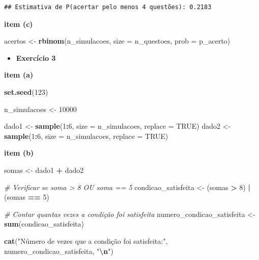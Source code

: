 \documentclass[
]{book}
\newenvironment{Shaded}{\begin{snugshade}}{\end{snugshade}}
\newcommand{\AttributeTok}[1]{\textcolor[rgb]{0.13,0.29,0.53}{#1}}
\newcommand{\CommentTok}[1]{\textcolor[rgb]{0.56,0.35,0.01}{\textit{#1}}}
\newcommand{\ConstantTok}[1]{\textcolor[rgb]{0.56,0.35,0.01}{#1}}
\newcommand{\DecValTok}[1]{\textcolor[rgb]{0.00,0.00,0.81}{#1}}
\newcommand{\FunctionTok}[1]{\textcolor[rgb]{0.13,0.29,0.53}{\textbf{#1}}}
\newcommand{\NormalTok}[1]{#1}
\newcommand{\OtherTok}[1]{\textcolor[rgb]{0.56,0.35,0.01}{#1}}
\newcommand{\SpecialCharTok}[1]{\textcolor[rgb]{0.81,0.36,0.00}{\textbf{#1}}}
\newcommand{\StringTok}[1]{\textcolor[rgb]{0.31,0.60,0.02}{#1}}
\providecommand{\tightlist}{%
  \setlength{\itemsep}{0pt}\setlength{\parskip}{0pt}}
\begin{document}
\begin{verbatim}
## Estimativa de P(acertar pelo menos 4 questões): 0.2183
\end{verbatim}

\textbf{item (c)}

\begin{Shaded}
\begin{Highlighting}[]
\NormalTok{acertos }\OtherTok{\textless{}{-}} \FunctionTok{rbinom}\NormalTok{(n\_simulacoes, }\AttributeTok{size =}\NormalTok{ n\_questoes, }\AttributeTok{prob =}\NormalTok{ p\_acerto)}
\end{Highlighting}
\end{Shaded}

\begin{itemize}
\tightlist
\item
  \textbf{Exercício 3}
\end{itemize}

\textbf{item (a)}

\begin{Shaded}
\begin{Highlighting}[]
\FunctionTok{set.seed}\NormalTok{(}\DecValTok{123}\NormalTok{)}

\NormalTok{n\_simulacoes }\OtherTok{\textless{}{-}} \DecValTok{10000}

\NormalTok{dado1 }\OtherTok{\textless{}{-}} \FunctionTok{sample}\NormalTok{(}\DecValTok{1}\SpecialCharTok{:}\DecValTok{6}\NormalTok{, }\AttributeTok{size =}\NormalTok{ n\_simulacoes, }\AttributeTok{replace =} \ConstantTok{TRUE}\NormalTok{)}
\NormalTok{dado2 }\OtherTok{\textless{}{-}} \FunctionTok{sample}\NormalTok{(}\DecValTok{1}\SpecialCharTok{:}\DecValTok{6}\NormalTok{, }\AttributeTok{size =}\NormalTok{ n\_simulacoes, }\AttributeTok{replace =} \ConstantTok{TRUE}\NormalTok{)}
\end{Highlighting}
\end{Shaded}

\textbf{item (b)}

\begin{Shaded}
\begin{Highlighting}[]
\NormalTok{somas }\OtherTok{\textless{}{-}}\NormalTok{ dado1 }\SpecialCharTok{+}\NormalTok{ dado2}

\CommentTok{\# Verificar se soma \textgreater{} 8 OU soma == 5}
\NormalTok{condicao\_satisfeita }\OtherTok{\textless{}{-}}\NormalTok{ (somas }\SpecialCharTok{\textgreater{}} \DecValTok{8}\NormalTok{) }\SpecialCharTok{|}\NormalTok{ (somas }\SpecialCharTok{==} \DecValTok{5}\NormalTok{)}

\CommentTok{\# Contar quantas vezes a condição foi satisfeita}
\NormalTok{numero\_condicao\_satisfeita }\OtherTok{\textless{}{-}} \FunctionTok{sum}\NormalTok{(condicao\_satisfeita)}

\FunctionTok{cat}\NormalTok{(}\StringTok{"Número de vezes que a condição foi satisfeita:"}\NormalTok{, numero\_condicao\_satisfeita, }\StringTok{"}\SpecialCharTok{\textbackslash{}n}\StringTok{"}\NormalTok{)}
\end{Highlighting}
\end{Shaded}
\end{document}
